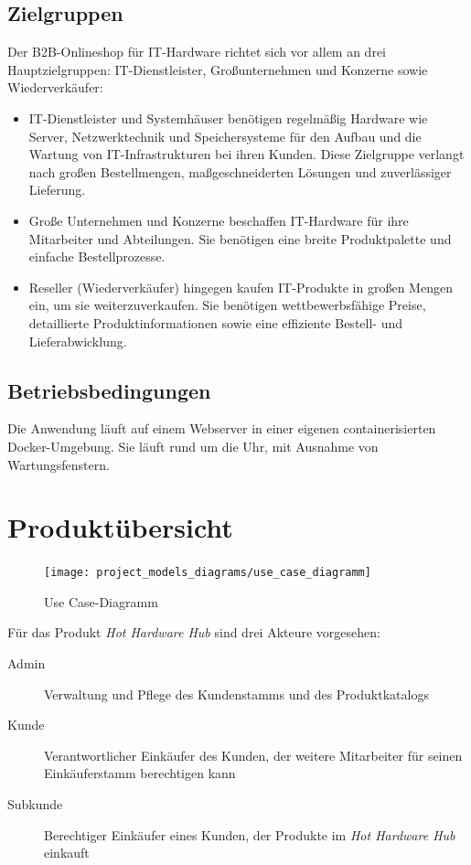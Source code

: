 \documentclass[%
	12pt,
	a4paper,
	oneside,
	parskip=full
]{scrbook}
\begin{document}
\section{Zielgruppen}
Der B2B-Onlineshop für IT-Hardware richtet sich vor allem an drei Hauptzielgruppen:
IT-Dienstleister, Großunternehmen und Konzerne sowie Wiederverkäufer:
\begin{itemize}
	\item IT-Dienstleister und Systemhäuser benötigen regelmäßig Hardware wie Server, Netzwerktechnik und Speichersysteme für den Aufbau und die Wartung von IT-Infrastrukturen bei ihren Kunden.
	Diese Zielgruppe verlangt nach großen Bestellmengen, maßgeschneiderten Lösungen und zuverlässiger Lieferung.
	\item Große Unternehmen und Konzerne beschaffen IT-Hardware für ihre Mitarbeiter und Abteilungen.
	Sie benötigen eine breite Produktpalette und einfache Bestellprozesse.
	\item Reseller (Wiederverkäufer) hingegen kaufen IT-Produkte in großen Mengen ein, um sie weiterzuverkaufen.
	Sie benötigen wettbewerbsfähige Preise, detaillierte Produktinformationen sowie eine effiziente Bestell- und Lieferabwicklung.
\end{itemize}
\section{Betriebsbedingungen}
Die Anwendung läuft auf einem Webserver in einer eigenen containerisierten Docker-Umgebung.
Sie läuft rund um die Uhr, mit Ausnahme von Wartungsfenstern.

\chapter{Produktübersicht}
\begin{figure}[ht]
	\centering
	\texttt{[image: project\_models\_diagrams/use\_case\_diagramm]}
	\caption{Use Case-Diagramm}
\end{figure}
Für das Produkt \emph{Hot Hardware Hub} sind drei Akteure vorgesehen:
\begin{description}
	\item[Admin] Verwaltung und Pflege des Kundenstamms und des Produktkatalogs
	\item[Kunde] Verantwortlicher Einkäufer des Kunden, der weitere Mitarbeiter für seinen Einkäuferstamm berechtigen kann
	\item[Subkunde] Berechtiger Einkäufer eines Kunden, der Produkte im \emph{Hot Hardware Hub} einkauft
\end{description}
\end{document}
